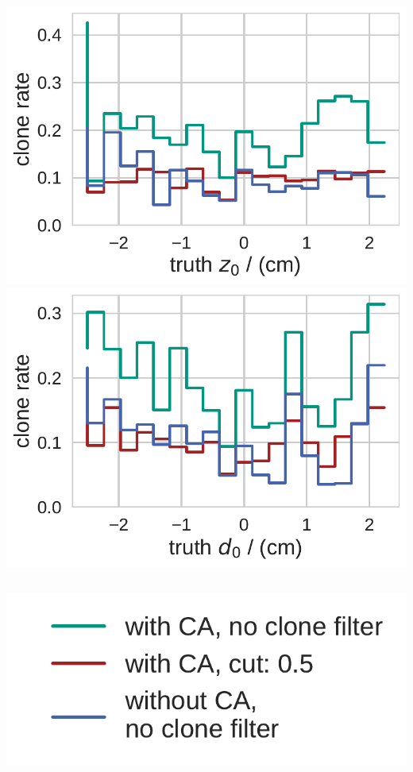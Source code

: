\documentclass[18pt, aspectratio=169]{beamer}
\begin{document}
\begin{frame}
\begin{columns}
    \begin{column}{.5\textwidth}
      \centering
      \includegraphics[width=.55\textwidth]{figures/clone_rate_by_z0_truth_fullreco_trainedWithFakes.pdf}\\
      \includegraphics[width=.55\textwidth]{figures/clone_rate_by_d0_truth_fullreco_trainedWithFakes.pdf}
    \end{column}
  \end{columns}
  \begin{center}
    \includegraphics[width=.25\textwidth]{figures/legend_fom_profile.pdf}\\
  \end{center}
\end{frame}
\end{document}
